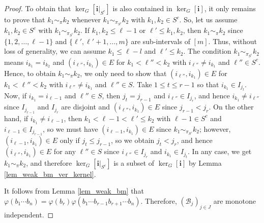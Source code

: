 \documentclass[10pt,a4paper]{amsart}
\begin{document}
\begin{proof}
	To obtain that $\ker_G[\bm{i}|_{S^c}]$ is also contained in $\ker_G[\bm{i}]$, it only remains to prove that $k_1 \sim_\pi k_2$ whenever $k_1 \sim_{\pi_{S^c}} k_2$ with $k_1,k_2 \in S^c$. 
	So, let us assume $k_1,k_2 \in S^c$ with $k_1 \sim_{\pi_{S^c}} k_2$. 
	If $k_1 , k_2 \leq \ell-1$ or $\ell' \leq k_1,k_2$, then $k_1 \sim_\pi k_2$ since $\{1,2,\ldots,\ell-1\}$ and $\{\ell',\ell'+1,\ldots,m\}$ are sub-intervals of $[m]$. 
	Thus, without loss of generality, we can assume $k_1 \leq \ell-l$ and $\ell' \leq k_2$.
	The condition $k_1 \sim_{\pi_{S^c}} k_2$ means $i_{k_1} = i_{k_2}$ and $(i_{\ell''},i_{k_1}) \in E$ for $k_1 < \ell'' < k_2$ with $i_{\ell''} \neq i_{k_1}$ and $\ell'' \in S^c$. 
	Hence, to obtain $k_1 \sim_\pi k_2$, we only need to show that $(i_{\ell''},i_{k_1}) \in E$ for $k_1 < \ell'' < k_2$ with $i_{\ell''} \neq i_{k_1}$ and $\ell'' \in S$. 
	Take $1 \leq t \leq r-1$ so that $i_{k_1} \in I_{j_{t}} $. 
	Now, if $i_{k_1} = i_{\ell-1}$ and $\ell'' \in S$, then $j_t = j_{r-1}$ and $i_{\ell''} \in I_{j_{r}}$, and hence $i_{k_1}\neq i_{\ell''}$ since $I_{j_{r-1}}$ and $I_{j_{r}}$ are disjoint and $(i_{\ell''},i_{k_1}) \in E$ since $j_{r-1} < j_r$.
	On the other hand, if $i_{k_1} \neq i_{\ell-1}$, then $k_1 < \ell -1 < \ell' \leq k_2$ with $\ell - 1 \in S^c$ and $i_{\ell-1} \in I_{j_{r-1}}$, so we must have  $(i_{\ell-1},i_{k_1}) \in E$ since  $k_1 \sim_{\pi_{S^c}} k_2$; however, $(i_{\ell-1},i_{k_1}) \in E$  only if $j_t \leq j_{r-1}$, so we obtain $j_t < j_r$, and hence  $(i_{\ell''},i_{k_1}) \in E$  for any $\ell'' \in S$ since $i_{\ell''} \in I_{j_{r}}$ and $i_{k_1} \in I_{j_t}$. 
	In any case, we get $k_1 \sim_\pi k_2$, and therefore $\ker_G[\bm{i}|_{S^c}]$ is a subset of  $\ker_G[\bm{i}]$ by Lemma \ref{lem_weak_bm_ver_kernel}. 
	
	It follows from Lemma \ref{lem_weak_bm} that $\varphi(b_1 \cdots b_n) = \varphi(b_r)  \varphi(b_1 \cdots b_{r-1}b_{r+1}\cdots b_n)$. 
	Therefore,  $(\mathcal{B}_j)_{j \in J}$ are monotone independent. 
\end{proof}
\end{document}
